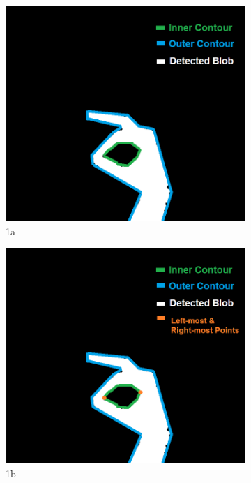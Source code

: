 \begin{figure}[H]
\begin{subfigure}{.5\textwidth}
  \centering
  \includegraphics[width=.8\linewidth]{Files/Figures/2.png}
  \caption{1a}
  \label{fig:sfig1}
\end{subfigure}%
\begin{subfigure}{.5\textwidth}
  \centering
  \includegraphics[width=.8\linewidth]{Files/Figures/3.png}
  \caption{1b}
  \label{fig:sfig2}
\end{subfigure}\\
\begin{subfigure}{.5\textwidth}
  \centering

\end{subfigure}
\end{figure}
